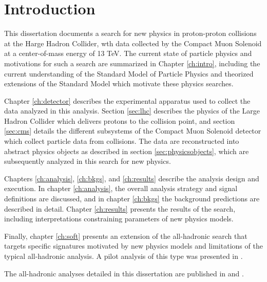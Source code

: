 \chapter{Introduction}
\label{ch:introduction}

This dissertation documents a search for new physics in proton-proton collisions at the Harge Hadron Collider, wth data collected by the Compact Muon Solenoid at a center-of-mass energy of 13 TeV. The current state of particle physics and motivations for such a search are summarized in Chapter \ref{ch:intro}, including the current understanding of the Standard Model of Particle Physics and theorized extensions of the Standard Model which motivate these physics searches.

Chapter \ref{ch:detector} describes the experimental apparatus used to collect the data analyzed in this analysis. Section \ref{sec:lhc} describes the physics of the Large Hadron Collider which delivers protons to the collision point, and section \ref{sec:cms} details the different subsystems of the Compact Muon Solenoid detector which collect particle data from collisions. The data are reconstructed into abstract physics objects as described in section \ref{sec:physicsobjects}, which are subsequently analyzed in this search for new physics.

Chapters \ref{ch:analysis}, \ref{ch:bkgs}, and \ref{ch:results} describe the analysis design and execution. In chapter \ref{ch:analysis}, the overall analysis strategy and signal definitions are discussed, and in chapter \ref{ch:bkgs} the background predictions are described in detail. Chapter \ref{ch:results} presents the results of the search, including interpretations constraining parameters of new physics models.

Finally, chapter \ref{ch:soft} presents an extension of the all-hadronic search that targets specific signatures motivated by new physics models and limitations of the typical all-hadronic analysis. A pilot analysis of this type was presented in \cite{CMS-PAS-SUS-16-011}.

The all-hadronic analyses detailed in this dissertation are published in \cite{mt2_2016} and \cite{mt2_2017}.

